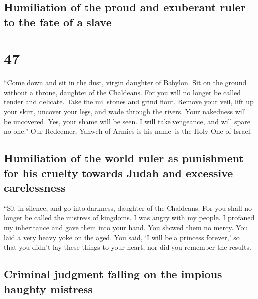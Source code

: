 \begin{paracol}{2}
\switchcolumn
\begin{otherlanguage}{english}

\hypertarget{humiliation-of-the-proud-and-exuberant-ruler-to-the-fate-of-a-slave}{%
\subsection{Humiliation of the proud and exuberant ruler to the fate of
a
slave}\label{humiliation-of-the-proud-and-exuberant-ruler-to-the-fate-of-a-slave}}

\hypertarget{section-93}{%
\section{47}\label{section-93}}

 ``Come down and sit in the dust, virgin daughter of
Babylon. Sit on the ground without a throne, daughter of the Chaldeans.
For you will no longer be called tender and delicate. 
Take the millstones and grind flour. Remove your veil, lift up your
skirt, uncover your legs, and wade through the rivers. 
Your nakedness will be uncovered. Yes, your shame will be seen. I will
take vengeance, and will spare no one.''  Our Redeemer,
Yahweh of Armies is his name, is the Holy One of Israel.

\hypertarget{humiliation-of-the-world-ruler-as-punishment-for-his-cruelty-towards-judah-and-excessive-carelessness}{%
\subsection{Humiliation of the world ruler as punishment for his cruelty
towards Judah and excessive
carelessness}\label{humiliation-of-the-world-ruler-as-punishment-for-his-cruelty-towards-judah-and-excessive-carelessness}}

 ``Sit in silence, and go into darkness, daughter of the
Chaldeans. For you shall no longer be called the mistress of kingdoms.
 I was angry with my people. I profaned my inheritance and
gave them into your hand. You showed them no mercy. You laid a very
heavy yoke on the aged.  You said, `I will be a princess
forever,' so that you didn't lay these things to your heart, nor did you
remember the results.

\hypertarget{criminal-judgment-falling-on-the-impious-haughty-mistress}{%
\subsection{Criminal judgment falling on the impious haughty
mistress}\label{criminal-judgment-falling-on-the-impious-haughty-mistress}}


\end{otherlanguage}
\end{paracol}
